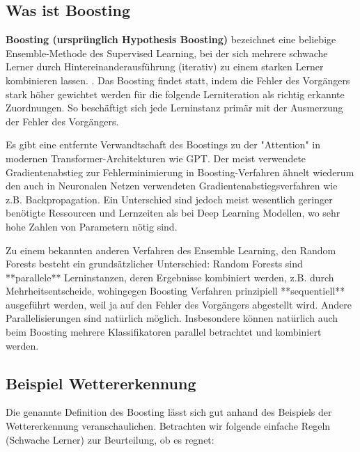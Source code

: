 \subsection{Was ist Boosting}
\begin{mdframed}
    \textbf{Boosting (ursprünglich Hypothesis Boosting)} bezeichnet eine beliebige Ensemble-Methode des Supervised Learning, bei der sich mehrere schwache Lerner durch Hintereinanderausführung (iterativ) zu einem starken Lerner kombinieren lassen. \textcite[S.~191]{Geron2018}. Das Boosting findet statt, indem die Fehler des Vorgängers stark höher gewichtet werden für die folgende Lerniteration als richtig erkannte Zuordnungen. So beschäftigt sich jede Lerninstanz primär mit der Ausmerzung der Fehler des Vorgängers.
    
Es gibt eine entfernte Verwandtschaft des Boostings zu der "Attention" in modernen Transformer-Architekturen wie GPT. Der meist verwendete Gradientenabstieg zur Fehlerminimierung in Boosting-Verfahren ähnelt wiederum den auch in Neuronalen Netzen verwendeten Gradientenabstiegsverfahren wie z.B. Backpropagation. Ein Unterschied sind jedoch meist wesentlich geringer benötigte Ressourcen und Lernzeiten als bei Deep Learning Modellen, wo sehr hohe Zahlen von Parametern nötig sind.

Zu einem bekannten anderen Verfahren des Ensemble Learning, den Random Forests besteht ein grundsätzlicher Unterschied: Random Forests sind **parallele** Lerninstanzen, deren Ergebnisse kombiniert werden, z.B. durch Mehrheitsentscheide, wohingegen Boosting Verfahren prinzipiell **sequentiell** ausgeführt werden, weil ja auf den Fehler des Vorgängers abgestellt wird. Andere Parallelisierungen sind natürlich möglich.\textcite[S.343]{Frochte202} Insbesondere können natürlich auch beim Boosting mehrere Klassifikatoren parallel betrachtet und kombiniert werden.

\subsection{Beispiel Wettererkennung}
\end{mdframed}

Die genannte Definition des Boosting lässt sich gut anhand des Beispiels der Wettererkennung veranschaulichen. Betrachten wir folgende einfache Regeln (Schwache Lerner) zur Beurteilung, ob es regnet:


